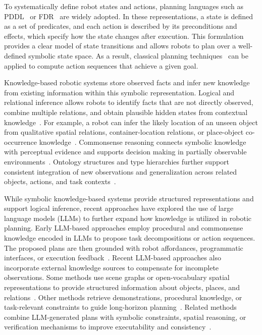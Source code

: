 To systematically define robot states and actions, planning languages such as PDDL~\cite{aeronautiques1998pddl} or FDR~\cite{helmert2009concise} are widely adopted. In these representations, a state is defined as a set of predicates, and each action is described by its preconditions and effects, which specify how the state changes after execution. This formulation provides a clear model of state transitions and allows robots to plan over a well-defined symbolic state space. As a result, classical planning techniques~\cite{hoffmann2001ff, helmert2006fast, correa2024lifted} can be applied to compute action sequences that achieve a given goal.


Knowledge-based robotic systems store observed facts and infer new knowledge from existing information within this symbolic representation. Logical and relational inference allows robots to identify facts that are not directly observed, combine multiple relations, and obtain plausible hidden states from contextual knowledge~\cite{tenorth2012knowledge,liu2020graph}. For example, a robot can infer the likely location of an unseen object from qualitative spatial relations, container-location relations, or place-object co-occurrence knowledge~\cite{kunze2014using,hasegawa2023inferring}. Commonsense reasoning connects symbolic knowledge with perceptual evidence and supports decision making in partially observable environments~\cite{mota2021integrated,zhang2024icorpp,daruna2019robocse}. Ontology structures and type hierarchies further support consistent integration of new observations and generalization across related objects, actions, and task contexts~\cite{mitrevsk2021ontology,olivares2019review,manzoor2021ontology}.

While symbolic knowledge-based systems provide structured representations and support logical inference, recent approaches have explored the use of large language models (LLMs) to further expand how knowledge is utilized in robotic planning. Early LLM-based approaches employ procedural and commonsense knowledge encoded in LLMs to propose task decompositions or action sequences. The proposed plans are then grounded with robot affordances, programmatic interfaces, or execution feedback~\cite{ahn2022can,huang2022inner,singh2023progprompt,liang2023code,ding2023task}. Recent LLM-based approaches also incorporate external knowledge sources to compensate for incomplete observations. Some methods use scene graphs or open-vocabulary spatial representations to provide structured information about objects, places, and relations~\cite{gu2024conceptgraphs,leanza2025conceptbot}. Other methods retrieve demonstrations, procedural knowledge, or task-relevant constraints to guide long-horizon planning~\cite{singh2025adaptbot,zhouenhancing,xu2024p,wang2025instructrag,kumar2026open}. Related methods combine LLM-generated plans with symbolic constraints, spatial reasoning, or verification mechanisms to improve executability and consistency~\cite{huang2023voxposer,dai2024optimal,liu2025delta,paulius2025bootstrapping,quartey2025verifiably}.

